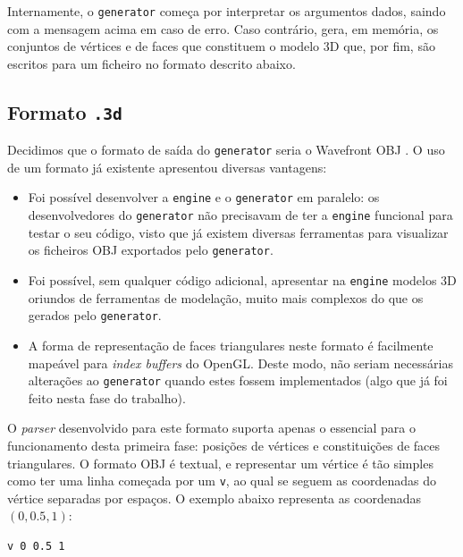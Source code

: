 \documentclass[12pt, a4paper]{article}
\begin{document}
Internamente, o \texttt{generator} começa por interpretar os argumentos dados, saindo com a mensagem
acima em caso de erro. Caso contrário, gera, em memória, os conjuntos de vértices e de faces que
constituem o modelo 3D que, por fim, são escritos para um ficheiro no formato descrito abaixo.

\subsection{Formato \texttt{.3d}}

Decidimos que o formato de saída do \texttt{generator} seria o Wavefront OBJ \cite{wavefront-obj}.
O uso de um formato já existente apresentou diversas vantagens:

\begin{itemize}
    \item Foi possível desenvolver a \texttt{engine} e o \texttt{generator} em paralelo: os
        desenvolvedores do \texttt{generator} não precisavam de ter a \texttt{engine} funcional para
        testar o seu código, visto que já existem diversas ferramentas para visualizar os ficheiros
        OBJ exportados pelo \texttt{generator}.

    \item Foi possível, sem qualquer código adicional, apresentar na \texttt{engine} modelos 3D
        oriundos de ferramentas de modelação, muito mais complexos do que os gerados pelo
        \texttt{generator}.

    \item A forma de representação de faces triangulares neste formato é facilmente mapeável para
        \emph{index buffers} do OpenGL. Deste modo, não seriam necessárias alterações ao
        \texttt{generator} quando estes fossem implementados (algo que já foi feito nesta fase do
        trabalho).
\end{itemize}

O \emph{parser} desenvolvido para este formato suporta apenas o essencial para o funcionamento desta
primeira fase: posições de vértices e constituições de faces triangulares. O formato OBJ é textual,
e representar um vértice é tão simples como ter uma linha começada por um \texttt{v}, ao qual se
seguem as coordenadas do vértice separadas por espaços. O exemplo abaixo representa as coordenadas
$(0, 0.5, 1)$:

\begin{verbatim}
v 0 0.5 1
\end{verbatim}
\end{document}
